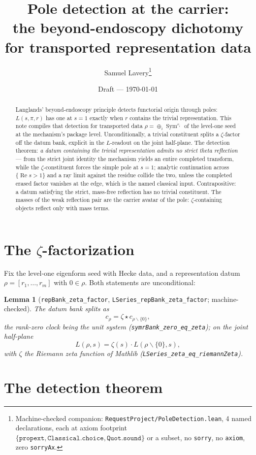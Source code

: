 \documentclass[11pt]{article}
\title{Pole detection at the carrier:\\
the beyond-endoscopy dichotomy for transported representation data}
\author{Samuel Lavery\thanks{Machine-checked companion:
\texttt{RequestProject/PoleDetection.lean}, 4 named declarations, each at axiom
footprint $\{\texttt{propext},\texttt{Classical.choice},\texttt{Quot.sound}\}$ or a
subset, no \texttt{sorry}, no \texttt{axiom}, zero \texttt{sorryAx}.}}
\date{Draft --- \today}
\newtheorem{lemma}[theorem]{Lemma}
\newcommand{\Sym}{\operatorname{Sym}}
\begin{document}
\maketitle

\begin{abstract}
Langlands' beyond-endoscopy principle detects functorial origin through poles:
$L(s,\pi,r)$ has one at $s=1$ exactly when $r$ contains the trivial
representation.  This note compiles that detection for transported data
$\rho=\oplus_i\Sym^{r_i}$ of the level-one seed at the mechanism's package level.
Unconditionally, a trivial constituent splits a $\zeta$-factor off the
datum bank, explicit in the $L$-readout on the joint half-plane.  The detection
theorem: \emph{a datum containing the trivial representation admits no strict theta
reflection} --- from the strict joint identity the mechanism yields an entire
completed transform, while the $\zeta$-constituent forces the simple pole at $s=1$;
analytic continuation across $\{\operatorname{Re}s>1\}$ and a ray limit against the
residue collide the two, unless the completed erased factor vanishes at the edge,
which is the named classical input.  Contrapositive: a datum satisfying the strict,
mass-free reflection has no trivial constituent.  The masses of the weak reflection
pair are the carrier avatar of the pole: $\zeta$-containing objects reflect only with
mass terms.
\end{abstract}

\section{The $\zeta$-factorization}

Fix the level-one eigenform seed with Hecke data, and a representation datum
$\rho=[r_1,\dots,r_m]$ with $0\in\rho$.  Both statements are unconditional:

\begin{lemma}[\texttt{repBank\_zeta\_factor},
\texttt{LSeries\_repBank\_zeta\_factor}; machine-checked]\label{lem:zeta}
The datum bank splits as
\[
c_\rho=\zeta\star c_{\rho\smallsetminus\{0\}},
\]
the rank-zero clock being the unit system
(\texttt{symrBank\_zero\_eq\_zeta}); on the joint half-plane
\[
L(\rho,s)=\zeta(s)\cdot L(\rho\smallsetminus\{0\},s),
\]
with $\zeta$ the Riemann zeta function of Mathlib
(\texttt{LSeries\_zeta\_eq\_riemannZeta}).
\end{lemma}

\section{The detection theorem}
\end{document}
